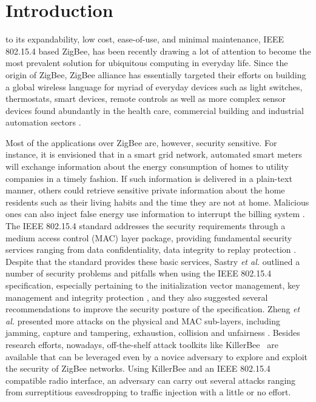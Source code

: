 \documentclass[10pt,journal,cspaper,compsoc]{IEEEtran}
\begin{document}
\maketitle

\IEEEdisplaynotcompsoctitleabstractindextext

\IEEEpeerreviewmaketitle


\section{Introduction}
 to its expandability, low cost, ease-of-use, and minimal maintenance, IEEE 802.15.4 based ZigBee,  has been recently drawing a lot of attention to become the most prevalent solution for ubiquitous computing in everyday life. Since the origin of ZigBee, ZigBee alliance has essentially targeted their efforts on building a global wireless language for myriad of everyday devices such as light switches, thermostats, smart devices, remote controls as well as more complex sensor devices found abundantly in the health care, commercial building and industrial automation sectors \cite{poslad2011ubiquitous,alemdar2010wireless,he2011optimal,khan2012ubiquitous,chebrolu2013esense}.


Most of the applications over ZigBee are, however, security sensitive. For instance, it is envisioned that in a smart grid network, automated smart meters will exchange information about the energy consumption of homes to utility companies in a timely fashion. If such information is delivered in a plain-text manner, others could retrieve sensitive private information about the home residents such as their living habits and the time they are not at home. Malicious ones can also inject false energy use information to interrupt the billing system \cite{neuman2011mediating}. The IEEE 802.15.4 standard addresses the security requirements through a medium access control (MAC) layer package, providing fundamental security services ranging from data confidentiality, data integrity to replay protection \cite{IEEE802.15.4}. Despite that the standard provides these basic services, Sastry \textit{et al.} outlined a number of security problems and pitfalls when using the IEEE 802.15.4 specification, especially pertaining to the initialization vector management, key management and integrity protection \cite{Sastry}, and they also suggested several recommendations to improve the security posture of the specification. Zheng \textit{et al.} presented more attacks on the physical and MAC sub-layers, including jamming, capture and tampering, exhaustion, collision and unfairness \cite{zheng2006toward}. Besides research efforts, nowadays, off-the-shelf attack toolkits like KillerBee~\cite{killerbee} are available that can be leveraged even by a novice adversary to explore and exploit the security of ZigBee networks. Using KillerBee and an IEEE 802.15.4 compatible radio interface, an adversary can carry out several attacks ranging from surreptitious eavesdropping to traffic injection with a little or no effort.
\end{document}
